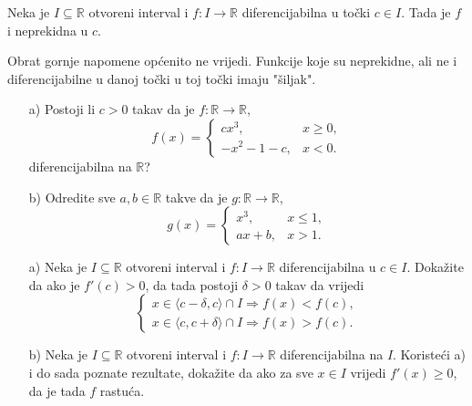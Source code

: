 \begin{remark}
Neka je $I\subseteq \mathbb{R}$ otvoreni interval i $f : I \to \mathbb{R}$ diferencijabilna u točki $c\in I$. Tada je $f$ i neprekidna u $c$.
\end{remark}
Obrat gornje napomene općenito ne vrijedi. Funkcije koje su neprekidne, ali ne i diferencijabilne u danoj točki u toj točki imaju "šiljak".
\begin{exercise} \textbf{}
\begin{itemize}
\item[a)] Postoji li $c>0$ takav da je $f : \mathbb{R}\to \mathbb{R}$,
$$f(x)=\begin{cases}
cx^3,& x\geq 0,\\
-x^2-1-c,& x<0.
\end{cases}$$
diferencijabilna na $\mathbb{R}$?
\item[b)] Odredite sve $a, b\in \mathbb{R}$ takve da je $g : \mathbb{R}\to \mathbb{R}$,
$$g(x)=\begin{cases}
x^3,& x\leq 1,\\
ax+b,& x>1.
\end{cases}$$
\end{itemize}
\end{exercise}
\begin{exercise} \textbf{}
\begin{itemize}
\item[a)] Neka je $I\subseteq \mathbb{R}$ otvoreni interval i $f : I \to \mathbb{R}$ diferencijabilna u $c\in I$. Dokažite da ako je $f'(c)>0$, da tada postoji $\delta>0$ takav da vrijedi
$$
\begin{cases}
x\in \langle c-\delta, c\rangle\cap I\Rightarrow f(x)<f(c),\\
x\in \langle c, c+\delta\rangle\cap I\Rightarrow f(x)>f(c).
\end{cases}
$$
\item[b)] Neka je $I\subseteq \mathbb{R}$ otvoreni interval i $f : I \to \mathbb{R}$ diferencijabilna na $I$. Koristeći a) i do sada poznate rezultate, dokažite da ako za sve $x\in I$ vrijedi $f'(x)\geq 0$, da je tada $f$ rastuća.
\end{itemize}
\end{exercise}
